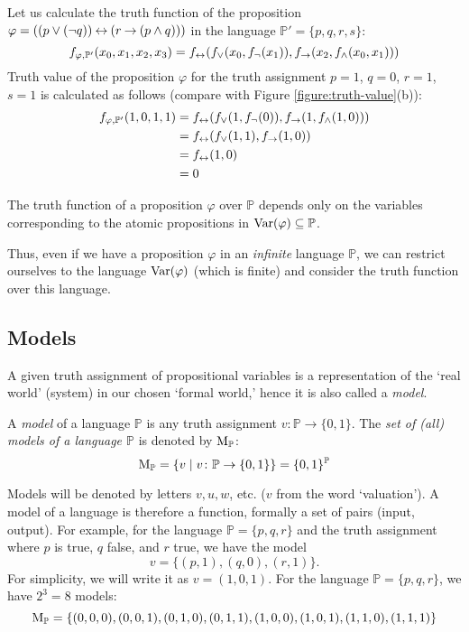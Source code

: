 \begin{example}
    Let us calculate the truth function of the proposition $\varphi = ((p \lor (\neg q)) \mathbin{\leftrightarrow} (r \mathbin{\rightarrow} (p \land q)))$ in the language $\mathbb{P}'=\{p,q,r,s\}$:
    $$        
    f_{\varphi,\mathbb P'}(x_0,x_1,x_2,x_3)=f_{\mathbin{\leftrightarrow}}(f_{\lor}(x_0,f_\neg(x_1)),f_{\mathbin{\rightarrow}}(x_2,f_{\land}(x_0,x_1)))    
    $$
    Truth value of the proposition $\varphi$ for the truth assignment $p=1$, $q=0$, $r=1$, $s=1$ is calculated as follows (compare with Figure \ref{figure:truth-value}(b)):
    \begin{align*}
    f_{\varphi,\mathbb P'}(1,0,1,1)
        &=f_{\mathbin{\leftrightarrow}}(f_{\lor}(1,f_\neg(0)),f_{\mathbin{\rightarrow}}(1,f_{\land}(1,0))) \\
        &=f_{\mathbin{\leftrightarrow}}(f_{\lor}(1,1),f_{\mathbin{\rightarrow}}(1,0))\\
        &=f_{\mathbin{\leftrightarrow}}(1,0)\\
        &=0
    \end{align*}
\end{example}

\begin{observation}
The truth function of a proposition $\varphi$ over $\mathbb{P}$ depends only on the variables corresponding to the atomic propositions in $\operatorname{Var}(\varphi)\subseteq\mathbb{P}$.
\end{observation}

Thus, even if we have a proposition $\varphi$ in an \emph{infinite} language $\mathbb{P}$, we can restrict ourselves to the language $\operatorname{Var}(\varphi)$ (which is finite) and consider the truth function over this language. 

\subsection{Models}

A given truth assignment of propositional variables is a representation of the `real world' (system) in our chosen `formal world,' hence it is also called a \emph{model}.

\begin{definition}\label{definition:model}
    A \emph{model} of a language $\mathbb{P}$ is any truth assignment $v\colon \mathbb{P}\to \{0,1\}$. The \emph{set of (all) models of a language $\mathbb{P}$} is denoted by $\operatorname{M}_\mathbb{P}$:
    $$
    \operatorname{M}_\mathbb{P}=\left\{v \mid v\colon \mathbb{P}\to \{0,1\}\right\}=\{0,1\}^\mathbb{P}
    $$
\end{definition}
Models will be denoted by letters $v,u,w$, etc. ($v$ from the word `valuation'). A model of a language is therefore a function, formally a set of pairs (input, output). For example, for the language $\mathbb{P}=\{p,q,r\}$ and the truth assignment where $p$ is true, $q$ false, and $r$ true, we have the model
$$
v = \{(p,1),(q,0),(r,1)\}.
$$
For simplicity, we will write it as $v = (1,0,1)$. For the language $\mathbb{P} = \{p,q,r\}$, we have $2^3 = 8$ models: 
$$
\operatorname{M}_\mathbb{P} = \{(0,0,0),(0,0,1),(0,1,0),(0,1,1),(1,0,0),(1,0,1),(1,1,0),(1,1,1)\}
$$

